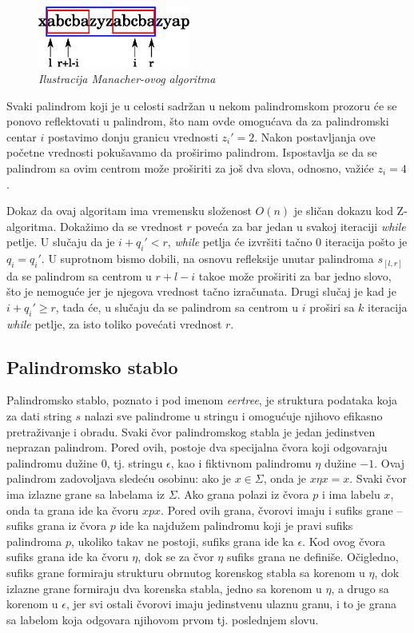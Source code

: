\begin{figure}[H]
    \centering
    \includegraphics[width=50mm]{../img/manacher1.eps}
    \caption*{\textit{Ilustracija Manacher-ovog algoritma}}
\end{figure}

Svaki palindrom koji je u celosti sadr\v zan u nekom palindromskom prozoru \' ce se ponovo reflektovati u palindrom, \v sto nam ovde omogu\' cava da za palindromski centar $i$ postavimo donju granicu vrednosti $z_i' = 2$. Nakon postavljanja ove po\v cetne vrednosti poku\v savamo da pro\v sirimo palindrom. Ispostavlja se da se palindrom sa ovim centrom mo\v ze pro\v siriti za jo\v s dva slova, odnosno, va\v zi\' ce $z_i = 4$.

Dokaz da ovaj algoritam ima vremensku slo\v zenost $O(n)$ je sli\v can dokazu kod Z-algoritma. Doka\v zimo da se vrednost $r$ pove\' ca za bar jedan u svakoj iteraciji \textit{while} petlje. U slu\v caju da je $i + q_i' < r$, \textit{while} petlja \' ce izvr\v siti ta\v cno $0$ iteracija po\v sto je $q_i = q_i'$. U suprotnom bismo dobili, na osnovu refleksije unutar palindroma $s_{[l,r]}$ da se palindrom sa centrom u $r+l-i$ tako\dj e mo\v ze pro\v siriti za bar jedno slovo, \v sto je nemogu\' ce jer je njegova vrednost ta\v cno izra\v cunata. Drugi slu\v caj je kad je $i + q_i' \geq r$, tada \' ce, u slu\v caju da se palindrom sa centrom u $i$ pro\v siri sa $k$ iteracija \textit{while} petlje, za isto toliko pove\' cati vrednost $r$. 

\subsection{Palindromsko stablo}

Palindromsko stablo, poznato i pod imenom \textit{eertree}, je struktura podataka koja za dati string $s$ nalazi sve palindrome u stringu i omogu\' cuje njihovo efikasno pretra\v zivanje i obradu. Svaki \v cvor palindromskog stabla je jedan jedinstven neprazan palindrom. Pored ovih, postoje dva specijalna \v cvora koji odgovaraju palindromu du\v zine $0$, tj. stringu $\epsilon$, kao i fiktivnom palindromu $\eta$ du\v zine $-1$. Ovaj palindrom zadovoljava slede\' cu osobinu: ako je $x \in \Sigma$, onda je $x\eta x = x$. Svaki \v cvor ima izlazne grane sa labelama iz $\Sigma$. Ako grana polazi iz \v cvora $p$ i ima labelu $x$, onda ta grana ide ka \v cvoru $xpx$. Pored ovih grana, \v cvorovi imaju i sufiks grane -- sufiks grana iz \v cvora $p$ ide ka najdu\v zem palindromu koji je pravi sufiks palindroma $p$, ukoliko takav ne postoji, sufiks grana ide ka $\epsilon$. Kod ovog \v cvora sufiks grana ide ka \v cvoru $\eta$, dok se za \v cvor $\eta$ sufiks grana ne defini\v se. O\v cigledno, sufiks grane formiraju strukturu obrnutog korenskog stabla sa korenom u $\eta$, dok izlazne grane formiraju dva korenska stabla, jedno sa korenom u $\eta$, a drugo sa korenom u $\epsilon$, jer svi ostali \v cvorovi imaju jedinstvenu ulaznu granu, i to je grana sa labelom koja odgovara njihovom prvom tj. poslednjem slovu.

